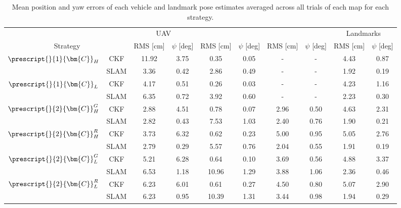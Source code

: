 \begin{table*}
	\centering
	\caption{Mean position and yaw errors of each vehicle and landmark pose estimates averaged across all trials of each map for each strategy.}
	\label{tab:avg_errors}
	\renewcommand{\arraystretch}{1.25}
	\begin{tabular}{c c | c c | c c | c c | c c}
		\toprule
		\toprule
		& &\multicolumn{2}{c|}{UAV}& \multicolumn{2}{c|}{\textsub{UGV}{1}} & \multicolumn{2}{c|}{\textsub{UGV}{2}} & \multicolumn{2}{c}{Landmarks} \\ 
		\multicolumn{2}{c|}{Strategy} & RMS [cm] & $\psi$ [deg] & RMS [cm] & $\psi$ [deg] & RMS [cm] & $\psi$ [deg] & RMS [cm] & $\psi$ [deg] \\ 
		\midrule
			\multirow{2}{*}{$\prescript{}{1}{\bm{C}}_{H}^{}$}
				& CKF  &  11.92 &   3.75&   0.35 &   0.05 & - & - &   4.43 &   0.87\\
				& SLAM &   3.36 &   0.42&   2.86 &   0.49 & - & - &   1.92 &   0.19\\
		\midrule
			\multirow{2}{*}{$\prescript{}{1}{\bm{C}}_{L}^{}$}
				& CKF  &   4.17 &   0.51&   0.26 &   0.03 & - & - &   4.23 &   1.16\\
				& SLAM &   6.35 &   0.72&   3.92 &   0.60 & - & - &   2.23 &   0.30\\
		\midrule
			\multirow{2}{*}{$\prescript{}{2}{\bm{C}}_{H}^{G}$}
				& CKF  &   2.88 &   4.51&   0.78 &   0.07 &   2.96 &   0.50 &   4.63 &   2.31\\
				& SLAM &   2.82 &   0.43&   7.53 &   1.03 &   2.40 &   0.76 &   1.90 &   0.21\\
		\midrule
			\multirow{2}{*}{$\prescript{}{2}{\bm{C}}_{H}^{R}$}
				& CKF  &   3.73 &   6.32&   0.62 &   0.23 &   5.00 &   0.95 &   5.05 &   2.76\\
				& SLAM &   2.79 &   0.29&   5.57 &   0.76 &   2.04 &   0.55 &   1.91 &   0.19\\
		\midrule
			\multirow{2}{*}{$\prescript{}{2}{\bm{C}}_{L}^{G}$}
				& CKF  &   5.21 &   6.28&   0.64 &   0.10 &   3.69 &   0.56 &   4.88 &   3.37\\
				& SLAM &   6.53 &   1.18&  10.96 &   1.29 &   3.88 &   1.06 &   2.36 &   0.46\\
		\midrule
			\multirow{2}{*}{$\prescript{}{2}{\bm{C}}_{L}^{R}$}
				& CKF  &   6.23 &   6.01&   0.61 &   0.27 &   4.50 &   0.80 &   5.07 &   2.90\\
				& SLAM &   6.23 &   0.95&  10.39 &   1.31 &   3.44 &   0.98 &   1.94 &   0.29\\
		\toprule
		\toprule
	\end{tabular}
	\renewcommand{\arraystretch}{1}
\end{table*}
